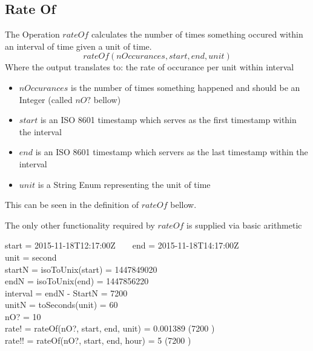\documentclass[../../main.tex]{subfiles}
\begin{document}
\subsection{Rate Of}
The Operation $rateOf$ calculates the number of times something occured
within an interval of time given a unit of time.
$$rateOf(nOccurances, start, end, unit)$$
Where the output translates to: the rate of occurance per unit within interval
\begin{itemize}
\item $nOccurances$ is the number of times something happened and should be an Integer (called $nO?$ bellow)
\item $start$ is an ISO 8601 timestamp which serves as the first timestamp within the interval
\item $end$ is an ISO 8601 timestamp which servers as the last timestamp within the interval
\item $unit$ is a String Enum representing the unit of time
\end{itemize}
This can be seen in the definition of $rateOf$ bellow.
The only other functionality required by $rateOf$ is supplied via basic arithmetic
\begin{argue}
  start = 2015-11-18T12:17:00Z ~ \land ~ end = 2015-11-18T14:17:00Z \\
  unit = second \\
  startN = isoToUnix(start) = 1447849020 \\
  endN = isoToUnix(end) = 1447856220 \\
  interval = endN - StartN = 7200\\
  unitN = toSeconds(unit) = 60 \\
  nO? = 10 \\
  rate! = rateOf(nO?, start, end, unit) = 0.001389  \div (7200 ) \\
  rate!! = rateOf(nO?, start, end, hour) = 5  \div (7200 )
\end{argue}
\end{document}
